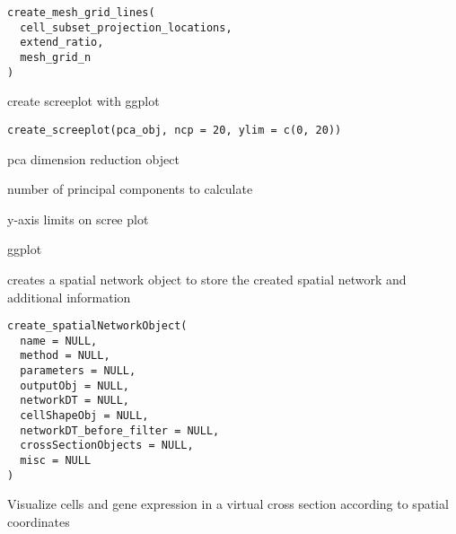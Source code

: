 \documentclass[a4paper]{book}
\begin{document}
%
\begin{Usage}
\begin{verbatim}
create_mesh_grid_lines(
  cell_subset_projection_locations,
  extend_ratio,
  mesh_grid_n
)
\end{verbatim}
\end{Usage}
%
\begin{Description}\relax
create screeplot with ggplot
\end{Description}
%
\begin{Usage}
\begin{verbatim}
create_screeplot(pca_obj, ncp = 20, ylim = c(0, 20))
\end{verbatim}
\end{Usage}
%
\begin{Arguments}
\begin{ldescription}
\item[\code{pca\_obj}] pca dimension reduction object

\item[\code{ncp}] number of principal components to calculate

\item[\code{ylim}] y-axis limits on scree plot
\end{ldescription}
\end{Arguments}
%
\begin{Value}
ggplot
\end{Value}
%
\begin{Description}\relax
creates a spatial network object to store the created spatial network and additional information
\end{Description}
%
\begin{Usage}
\begin{verbatim}
create_spatialNetworkObject(
  name = NULL,
  method = NULL,
  parameters = NULL,
  outputObj = NULL,
  networkDT = NULL,
  cellShapeObj = NULL,
  networkDT_before_filter = NULL,
  crossSectionObjects = NULL,
  misc = NULL
)
\end{verbatim}
\end{Usage}
%
\begin{Description}\relax
Visualize cells and gene expression in a virtual cross section according to spatial coordinates
\end{Description}
\end{document}
